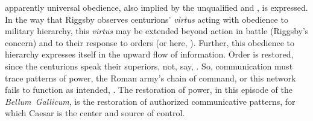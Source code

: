 \documentclass[12pt,letterpaper,oneside,final]{memoir}
\begin{document}
apparently universal obedience, also implied by the unqualified  and , is expressed. In the way that Riggsby observes centurions' \emph{virtus} acting with obedience to military hierarchy, this \emph{virtus} may be extended beyond action in battle (Riggsby's concern) and to their response to orders (or here, ). Further, this obedience to hierarchy expresses itself in the upward flow of information. Order is restored, since the centurions speak  their superiors, not, say, . So, communication must trace patterns of power, the Roman army's chain of command, or this network fails to function as intended, . The restoration of power, in this episode of the \emph{Bellum~Gallicum}, is the restoration of authorized communicative patterns, for which Caesar is the center and source of control.
\end{document}
